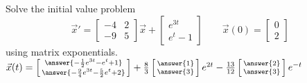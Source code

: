 \documentclass{ximera}
\begin{document}
\begin{exercise}
    Solve the initial value problem
    \[ 
        {\vec{x}}' = 
        \begin{bmatrix} 
            -4 & 2 \\ 
            -9 & 5 
        \end{bmatrix}
        \vec{x} + 
        \begin{bmatrix} 
            e^{3t} \\ 
            e^t - 1 
        \end{bmatrix} 
        \qquad \vec{x}(0) = 
        \begin{bmatrix} 
            0 \\ 
            2 
        \end{bmatrix} 
    \] 
    using matrix exponentials.\\
    $\vec{x}(t) = \left[\begin{smallmatrix} \answer{-\frac{1}{2}e^{3t} - e^t + 1} \\ \answer{-\frac{9}{4}e^{3t} - \frac{5}{2}e^t + 2} \end{smallmatrix}\right] + \frac{8}{3}\left[\begin{smallmatrix} \answer{1} \\ \answer{3} \end{smallmatrix}\right]e^{2t} - \frac{13}{12}\left[\begin{smallmatrix} \answer{2} \\ \answer{3} \end{smallmatrix}\right]e^{-t}$
\end{exercise}
\end{document}
